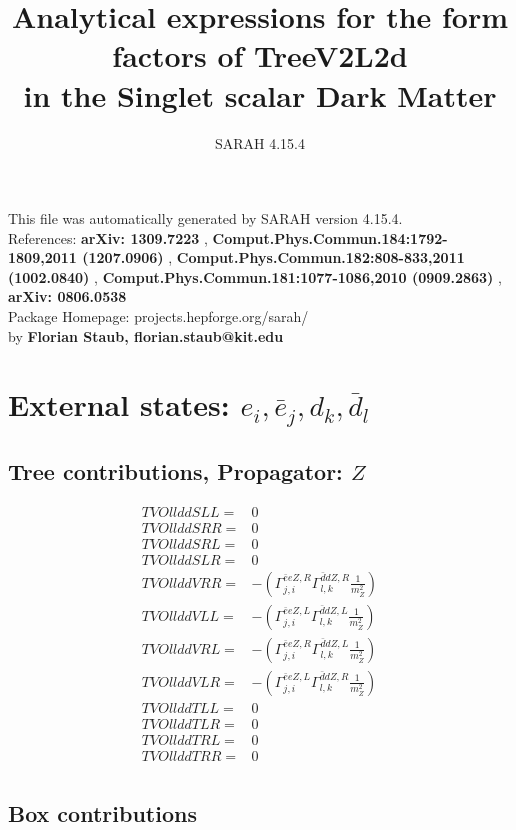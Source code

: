 \documentclass[A4,landscape]{article}
\begin{document}
\title{Analytical expressions for the form factors of TreeV2L2d\\ in the Singlet scalar Dark Matter } 
 \author{SARAH 4.15.4} 
 \maketitle 
 \vspace{10cm} 
This file was automatically generated by SARAH version 4.15.4.  \\ 
References: {\bf arXiv: 1309.7223 }, {\bf Comput.Phys.Commun.184:1792-1809,2011 (1207.0906) }, {\bf Comput.Phys.Commun.182:808-833,2011 (1002.0840) }, {\bf Comput.Phys.Commun.181:1077-1086,2010 (0909.2863) }, {\bf arXiv: 0806.0538 } \\ 
Package Homepage: projects.hepforge.org/sarah/ \\ 
by {\bf Florian Staub, florian.staub@kit.edu} 
 \pagebreak 
 \tableofcontents 
 \pagebreak 
\section{External states: ${e_{{i}}, \bar{e}_{{j}}, d_{{k}}, \bar{d}_{{l}}}$} 
\subsection{Tree contributions, Propagator: $Z$} 

\begin{align} 
  TVOllddSLL= & 0 \\ 
  TVOllddSRR= & 0 \\ 
  TVOllddSRL= & 0 \\ 
  TVOllddSLR= & 0 \\ 
  TVOllddVRR= & -(\Gamma^{\bar{e}e Z ,R}_{j, i} \Gamma^{\bar{d}d Z ,R}_{l, k} \frac{1}{m^2_{Z}}) \\ 
  TVOllddVLL= & -(\Gamma^{\bar{e}e Z ,L}_{j, i} \Gamma^{\bar{d}d Z ,L}_{l, k} \frac{1}{m^2_{Z}}) \\ 
  TVOllddVRL= & -(\Gamma^{\bar{e}e Z ,R}_{j, i} \Gamma^{\bar{d}d Z ,L}_{l, k} \frac{1}{m^2_{Z}}) \\ 
  TVOllddVLR= & -(\Gamma^{\bar{e}e Z ,L}_{j, i} \Gamma^{\bar{d}d Z ,R}_{l, k} \frac{1}{m^2_{Z}}) \\ 
  TVOllddTLL= & 0 \\ 
  TVOllddTLR= & 0 \\ 
  TVOllddTRL= & 0 \\ 
  TVOllddTRR= & 0 \\ 
\end{align} 
\subsection{Box contributions} 
\end{document}
